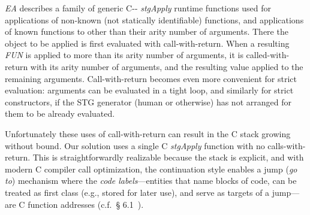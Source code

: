 \documentclass{llncs}
\begin{document}
\emph{EA} describes a family of generic C-{}- \emph{stgApply} runtime
functions used for applications of non-known (not statically identifiable)
functions, and applications of known functions to other than their arity
number of arguments.  There the object to be applied is first evaluated with
call-with-return.  When a resulting \emph{FUN} is applied to more than its
arity number of arguments, it is called-with-return with its arity number of
arguments, and the resulting value applied to the remaining arguments.  
%
Call-with-return becomes even more convenient for strict evaluation: arguments
can be evaluated in a tight loop, and similarly for strict constructors, if
the STG generator (human or otherwise) has not arranged for them to be already
evaluated.

Unfortunately these uses
of call-with-return can result in the C stack growing without bound.  Our
solution uses a single C \emph{stgApply} function with no calls-with-return.
This is straightforwardly realizable because the stack is explicit, and with
modern C compiler call optimization, the continuation style enables a jump
(\emph{go to}) mechanism where the \emph{code labels}---entities that name
blocks of code, can be treated as first class (e.g., stored for later use),
and serve as targets of a jump---are C function addresses (c.f.\ \S
6.1~\cite{PJ-stockhardware}).
\end{document}
